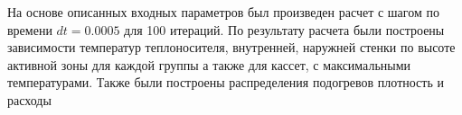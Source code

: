 
На основе описанных входных параметров был произведен расчет с шагом по времени $dt=0.0005$ для 100 итераций. По результату расчета были построены зависимости температур теплоносителя, внутренней, наружней стенки по высоте активной зоны для каждой группы а также для кассет, с максимальными температурами. Также были построены распределения подогревов плотность и расходы

